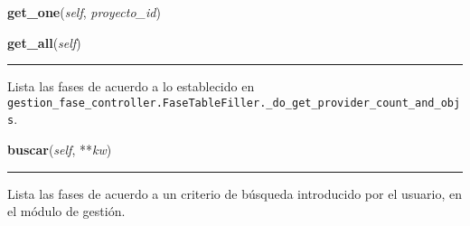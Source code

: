     \vspace{0.5ex}

\hspace{.8\funcindent}\begin{boxedminipage}{\funcwidth}

    \raggedright \textbf{get\_one}(\textit{self}, \textit{proyecto\_id})

\setlength{\parskip}{2ex}
\setlength{\parskip}{1ex}
    \end{boxedminipage}

    \label{saip:controllers:gestion_fase_controller:GestionFaseController:get_all}

    \vspace{0.5ex}

\hspace{.8\funcindent}\begin{boxedminipage}{\funcwidth}

    \raggedright \textbf{get\_all}(\textit{self})

    \vspace{-1.5ex}

    \rule{\textwidth}{0.5\fboxrule}
\setlength{\parskip}{2ex}
    Lista las fases de acuerdo a lo establecido en 
    \texttt{gestion\_fase\_controller.FaseTableFiller.\_do\_get\_provider\_count\_and\_objs}.

\setlength{\parskip}{1ex}
    \end{boxedminipage}

    \label{saip:controllers:gestion_fase_controller:GestionFaseController:buscar}

    \vspace{0.5ex}

\hspace{.8\funcindent}\begin{boxedminipage}{\funcwidth}

    \raggedright \textbf{buscar}(\textit{self}, **\textit{kw})

    \vspace{-1.5ex}

    \rule{\textwidth}{0.5\fboxrule}
\setlength{\parskip}{2ex}
    Lista las fases de acuerdo a un criterio de búsqueda introducido por el
    usuario, en el módulo de gestión.

\setlength{\parskip}{1ex}
    \end{boxedminipage}


